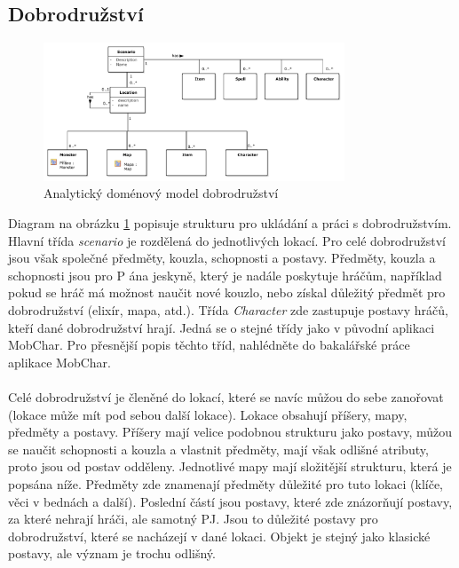 \documentclass[thesis=B,czech]{resources/FITthesis}[2012/06/26]
\begin{document}
\subsection{Dobrodružství}
\begin{figure}\centering
	\includegraphics[width=0.8\textwidth]{images/domain_scenario}
	\caption[Analytický doménový model dobrodružství]{Analytický doménový model dobrodružství}\label{fig:dm_scenario}
\end{figure}
Diagram na obrázku \ref{fig:dm_scenario} popisuje strukturu pro ukládání a práci s dobrodružstvím. Hlavní třída \textit{scenario} je rozdělená do jednotlivých lokací. Pro celé dobrodružství jsou však společné předměty, kouzla, schopnosti a postavy. Předměty, kouzla a schopnosti jsou pro P	ána jeskyně, který je nadále poskytuje hráčům, například pokud se hráč má možnost naučit nové kouzlo, nebo získal důležitý předmět pro dobrodružství (elixír, mapa, atd.). Třída \textit{Character} zde zastupuje postavy hráčů, kteří dané dobrodružství hrají. Jedná se o stejné třídy jako v původní aplikaci MobChar. Pro přesnější popis těchto tříd, nahlédněte do bakalářské práce aplikace MobChar\cite{Weberova_2017}.\\
\\
Celé dobrodružství je členěné do lokací, které se navíc můžou do sebe zanořovat (lokace může mít pod sebou další lokace). Lokace obsahují příšery, mapy, předměty a postavy. Příšery mají velice podobnou strukturu jako postavy, můžou se naučit schopnosti a kouzla a vlastnit předměty, mají však odlišné atributy, proto jsou od postav odděleny. Jednotlivé mapy mají složitější strukturu, která je popsána níže. Předměty zde znamenají předměty důležité pro tuto lokaci (klíče, věci v bednách a další). Poslední částí jsou postavy, které zde znázorňují postavy, za které nehrají hráči, ale samotný PJ. Jsou to důležité postavy pro dobrodružství, které se nacházejí v dané lokaci. Objekt je stejný jako klasické postavy, ale význam je trochu odlišný.
\end{document}
